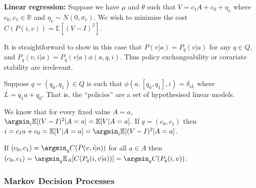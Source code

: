 \textbf{Linear regression:} Suppose we have $\mu$ and $\theta$ such that $V=c_1 A + c_0 + \eta_v$ where $c_0,c_1\in \mathbb{R}$ and $\eta_v \sim N(0,\sigma_v)$. We wish to minimise the cost $C(P(i,v)) = \mathbb{E}[(V-I)^2]$.

It is straightforward to show in this case that $P(v|a)=P_q(v|a)$ for any $q\in Q$, and $P_q(v,i|a)=P_q(v|a)\phi(a,q,i)$. Thus policy exchangeability or covariate stability are irrelevant. 

Suppose $q=(q_0,q_1)\in Q$ is such that $\phi(a,[q_0,q_1],i)=\delta_{iL}$ where $L=q_1 a + q_0$. That is, the ``policies'' are a set of hypothesised linear models.

We know that for every fixed value $A=a$, $\argmin_i \mathbb{E}[(V-I)^2|A=a]=\mathbb{E}[V|A=a]$. If $q=(c_0,c_1)$ then $i=c_1 a + c_0=\mathbb{E}[V|A=a]=\argmin_i \mathbb{E}[(V-I)^2|A=a]$. 

If $(c_0,c_1) = \argmin_q C(P(v,i|a))$ for all $a\in A$ then $(c_0,c_1)=\argmin_q \mathbb{E}_A[C(P_q(i,v|a))]=\argmin_qC(P_q(i,v))$.

\subsubsection{Markov Decision Processes}




